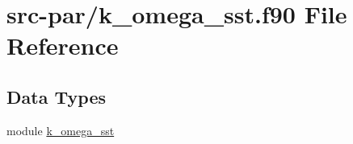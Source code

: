 \hypertarget{k__omega__sst_8f90}{\section{src-\/par/k\-\_\-omega\-\_\-sst.f90 File Reference}
\label{k__omega__sst_8f90}
}
\subsection*{Data Types}
\begin{DoxyCompactItemize}
\item 
module \hyperlink{classk__omega__sst}{k\-\_\-omega\-\_\-sst}
\end{DoxyCompactItemize}
